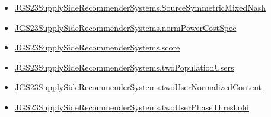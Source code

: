 \documentclass[10pt]{article}
\begin{document}
\begin{itemize}
\item \hyperlink{governing-declaration-8919e7334fa5ab60}{JGS23\allowbreak{}Supply\allowbreak{}Side\allowbreak{}Recommender\allowbreak{}Systems.\allowbreak{}Source\allowbreak{}Symmetric\allowbreak{}Mixed\allowbreak{}Nash}
\item \hyperlink{governing-declaration-6ba13dc1cae95e6e}{JGS23\allowbreak{}Supply\allowbreak{}Side\allowbreak{}Recommender\allowbreak{}Systems.\allowbreak{}norm\allowbreak{}Power\allowbreak{}Cost\allowbreak{}Spec}
\item \hyperlink{governing-declaration-e3725af4eb21c4db}{JGS23\allowbreak{}Supply\allowbreak{}Side\allowbreak{}Recommender\allowbreak{}Systems.\allowbreak{}score}
\item \hyperlink{governing-declaration-43b84bc2140424db}{JGS23\allowbreak{}Supply\allowbreak{}Side\allowbreak{}Recommender\allowbreak{}Systems.\allowbreak{}two\allowbreak{}Population\allowbreak{}Users}
\item \hyperlink{governing-declaration-ccdb8ef08ba775c0}{JGS23\allowbreak{}Supply\allowbreak{}Side\allowbreak{}Recommender\allowbreak{}Systems.\allowbreak{}two\allowbreak{}User\allowbreak{}Normalized\allowbreak{}Content}
\item \hyperlink{governing-declaration-63bdc0df0d11c740}{JGS23\allowbreak{}Supply\allowbreak{}Side\allowbreak{}Recommender\allowbreak{}Systems.\allowbreak{}two\allowbreak{}User\allowbreak{}Phase\allowbreak{}Threshold}
\end{itemize}
\end{document}
